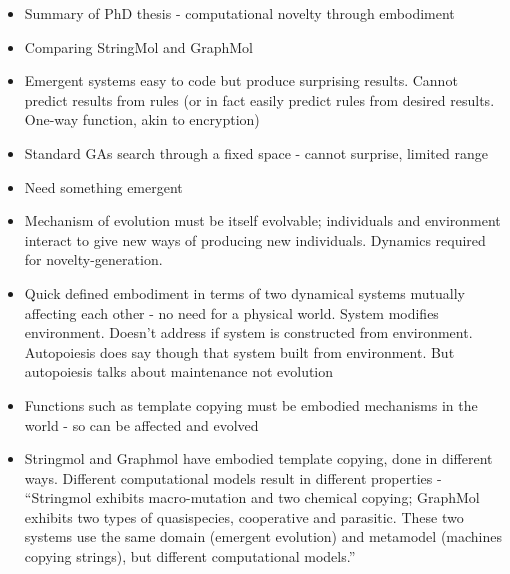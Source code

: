		\begin{itemize}
			\item
			
			Summary of PhD thesis - computational novelty through embodiment
			
			\item
			
			Comparing StringMol and GraphMol

			\item
			
			Emergent systems easy to code but produce surprising results. Cannot
			predict results from rules (or in fact easily predict rules from
			desired results. One-way function, akin to encryption)
			
			\item
			
			Standard GAs search through a fixed space - cannot surprise, limited
			range
			
			\item
			
			Need something emergent
			
			\item
			
			Mechanism of evolution must be itself evolvable; individuals and
			environment interact to give new ways of producing new individuals.
			Dynamics required for novelty-generation.
			
			\item
			
			Quick defined embodiment in terms of two dynamical systems mutually
			affecting each other - no need for a physical world. System modifies
			environment. Doesn't address if system is constructed from
			environment. Autopoiesis does say though that system built from
			environment. But autopoiesis talks about maintenance not evolution
			
			\item
			
			Functions such as template copying must be embodied mechanisms in the
			world - so can be affected and evolved
			
			\item
			
			Stringmol and Graphmol have embodied template copying, done in
			different ways. Different computational models result in different
			properties - ``Stringmol exhibits macro-mutation and two chemical
			copying; GraphMol exhibits two types of quasispecies, cooperative and
			parasitic. These two systems use the same domain (emergent evolution)
			and metamodel (machines copying strings), but different computational
			models.''
			
		\end{itemize}
		
